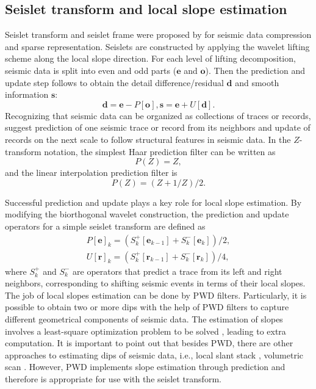 \subsection{Seislet transform and local slope estimation}

Seislet transform and seislet frame were proposed by \cite{fomel2010seislet} for seismic data compression and sparse representation. Seislets are constructed by applying the wavelet lifting scheme \citep{sweldens1998lifting} along the local slope direction. For each level of lifting decomposition, seismic data is split into even and odd parts ($\mathbf{e}$ and $\mathbf{o}$). Then the prediction and update step follows to obtain the detail difference/residual $\mathbf{d}$ and smooth information $\mathbf{s}$:
\begin{equation}
\mathbf{d}=\mathbf{e}-P[\mathbf{o}],\mathbf{s}=\mathbf{e}+U[\mathbf{d}].
\end{equation}
Recognizing that seismic data can be organized as collections of traces or records, \cite{fomel2010seislet} suggest prediction of one seismic trace or record from its neighbors and update of records on the next scale to follow structural features in seismic data. In the $Z$-transform notation, the simplest Haar prediction filter can be written as
\begin{equation}
 P(Z)=Z,
\end{equation}
and the linear interpolation prediction filter is
\begin{equation}
 P(Z)=(Z+1/Z)/2.
\end{equation}


Successful prediction and update plays a key role for local slope estimation. By modifying the biorthogonal wavelet construction, the prediction and update operators for a simple seislet transform are defined as
\begin{equation}
\begin{split}
 P[\mathbf{e}]_k=(S_k^{+}[\mathbf{e}_{k-1}] + S_{k}^{-} [\mathbf{e}_k]) /2,\\
 U[\mathbf{r}]_k=(S_k^{+}[\mathbf{r}_{k-1}] + S_{k}^{-} [\mathbf{r}_k]) /4,
\end{split}
\end{equation}
where $S_k^{+}$ and $S_k^{-}$ are operators that predict a trace from its left and right neighbors, corresponding to shifting seismic events in terms of their local slopes. The job of local slopes estimation can be done by PWD filters. Particularly, it is possible to obtain two or more dips with the help of PWD filters to capture different geometrical components of seismic data. The estimation of slopes involves a least-square optimization problem to be solved \citep{fomel2002applications}, leading to extra computation. It is important to point out that besides PWD, there are other approaches to estimating dips of seismic data, i.e., local slant stack \citep{ottolini1983signal}, volumetric scan \citep{marfurt2006robust}. However, PWD implements slope estimation through prediction and therefore is appropriate for use with the seislet transform. 


